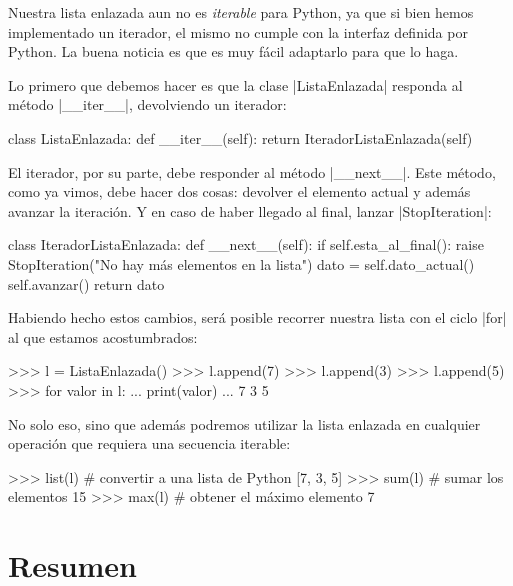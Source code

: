 Nuestra lista enlazada aun no es \emph{iterable} para Python, ya que si bien
hemos implementado un iterador, el mismo no cumple con la interfaz definida por
Python. La buena noticia es que es muy fácil adaptarlo para que lo haga.

Lo primero que debemos hacer es que la clase |ListaEnlazada| responda al método
|__iter__|, devolviendo un iterador:

\begin{codigo-python-sn}
class ListaEnlazada:
    def __iter__(self):
        return IteradorListaEnlazada(self)
\end{codigo-python-sn}

El iterador, por su parte, debe responder al método |__next__|. Este método,
como ya vimos, debe hacer dos cosas: devolver el elemento actual y además
avanzar la iteración. Y en caso de haber llegado al final, lanzar
|StopIteration|:

\begin{codigo-python-sn}
class IteradorListaEnlazada:
    def __next__(self):
        if self.esta_al_final():
            raise StopIteration("No hay más elementos en la lista")
        dato = self.dato_actual()
        self.avanzar()
        return dato
\end{codigo-python-sn}

Habiendo hecho estos cambios, será posible recorrer nuestra lista con el ciclo
|for| al que estamos acostumbrados:

\begin{codigo-python-sn}
>>> l = ListaEnlazada()
>>> l.append(7)
>>> l.append(3)
>>> l.append(5)
>>> for valor in l:
...     print(valor)
...
7
3
5
\end{codigo-python-sn}

No solo eso, sino que además podremos utilizar la lista enlazada en cualquier
operación que requiera una secuencia iterable:

\begin{codigo-python-sn}
>>> list(l) # convertir a una lista de Python
[7, 3, 5]
>>> sum(l) # sumar los elementos
15
>>> max(l) # obtener el máximo elemento
7
\end{codigo-python-sn}

\section{Resumen}

